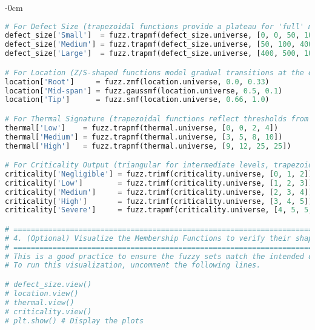 \documentclass[energies,supfile,submit,pdftex,moreauthors]{Definitions/mdpi}
\begin{document}
\begin{listing}[H]
\begin{adjustwidth}{-\extralength}{0cm}
\begin{lstlisting}[language=Python, style=mystyle]
# For Defect Size (trapezoidal functions provide a plateau for 'full' membership)
defect_size['Small']  = fuzz.trapmf(defect_size.universe, [0, 0, 50, 100])
defect_size['Medium'] = fuzz.trapmf(defect_size.universe, [50, 100, 400, 500])
defect_size['Large']  = fuzz.trapmf(defect_size.universe, [400, 500, 1000, 1000])

# For Location (Z/S-shaped functions model gradual transitions at the ends, Gaussian for the middle)
location['Root']     = fuzz.zmf(location.universe, 0.0, 0.33)
location['Mid-span'] = fuzz.gaussmf(location.universe, 0.5, 0.1)
location['Tip']      = fuzz.smf(location.universe, 0.66, 1.0)

# For Thermal Signature (trapezoidal functions reflect thresholds from industry standards)
thermal['Low']    = fuzz.trapmf(thermal.universe, [0, 0, 2, 4])
thermal['Medium'] = fuzz.trapmf(thermal.universe, [3, 5, 8, 10])
thermal['High']   = fuzz.trapmf(thermal.universe, [9, 12, 25, 25])

# For Criticality Output (triangular for intermediate levels, trapezoidal to cap the 'Severe' level)
criticality['Negligible'] = fuzz.trimf(criticality.universe, [0, 1, 2])
criticality['Low']        = fuzz.trimf(criticality.universe, [1, 2, 3])
criticality['Medium']     = fuzz.trimf(criticality.universe, [2, 3, 4])
criticality['High']       = fuzz.trimf(criticality.universe, [3, 4, 5])
criticality['Severe']     = fuzz.trapmf(criticality.universe, [4, 5, 5, 5])

# =============================================================================
# 4. (Optional) Visualize the Membership Functions to verify their shapes
# =============================================================================
# This is a good practice to ensure the fuzzy sets match the intended design.
# To run this visualization, uncomment the following lines.

# defect_size.view()
# location.view()
# thermal.view()
# criticality.view()
# plt.show() # Display the plots
\end{lstlisting}
\end{adjustwidth}
\end{listing}
\end{document}
